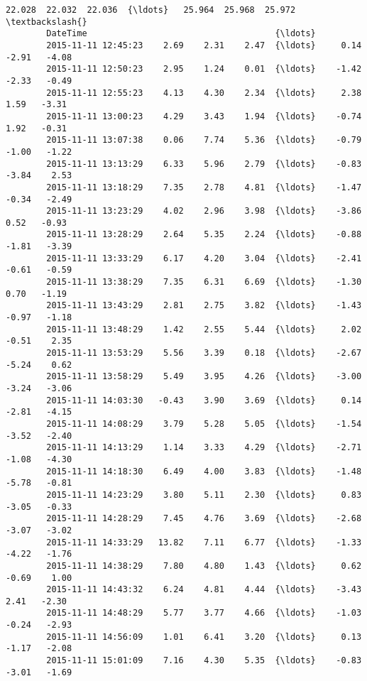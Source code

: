 \documentclass[a4paper,dvipdfmx]{jsarticle}
\begin{document}
\begin{Verbatim}[commandchars=\\\{\}]
                             22.028  22.032  22.036  {\ldots}   25.964  25.968  25.972  \textbackslash{}
        DateTime                                     {\ldots}                            
        2015-11-11 12:45:23    2.69    2.31    2.47  {\ldots}     0.14   -2.91   -4.08   
        2015-11-11 12:50:23    2.95    1.24    0.01  {\ldots}    -1.42   -2.33   -0.49   
        2015-11-11 12:55:23    4.13    4.30    2.34  {\ldots}     2.38    1.59   -3.31   
        2015-11-11 13:00:23    4.29    3.43    1.94  {\ldots}    -0.74    1.92   -0.31   
        2015-11-11 13:07:38    0.06    7.74    5.36  {\ldots}    -0.79   -1.00   -1.22   
        2015-11-11 13:13:29    6.33    5.96    2.79  {\ldots}    -0.83   -3.84    2.53   
        2015-11-11 13:18:29    7.35    2.78    4.81  {\ldots}    -1.47   -0.34   -2.49   
        2015-11-11 13:23:29    4.02    2.96    3.98  {\ldots}    -3.86    0.52   -0.93   
        2015-11-11 13:28:29    2.64    5.35    2.24  {\ldots}    -0.88   -1.81   -3.39   
        2015-11-11 13:33:29    6.17    4.20    3.04  {\ldots}    -2.41   -0.61   -0.59   
        2015-11-11 13:38:29    7.35    6.31    6.69  {\ldots}    -1.30    0.70   -1.19   
        2015-11-11 13:43:29    2.81    2.75    3.82  {\ldots}    -1.43   -0.97   -1.18   
        2015-11-11 13:48:29    1.42    2.55    5.44  {\ldots}     2.02   -0.51    2.35   
        2015-11-11 13:53:29    5.56    3.39    0.18  {\ldots}    -2.67   -5.24    0.62   
        2015-11-11 13:58:29    5.49    3.95    4.26  {\ldots}    -3.00   -3.24   -3.06   
        2015-11-11 14:03:30   -0.43    3.90    3.69  {\ldots}     0.14   -2.81   -4.15   
        2015-11-11 14:08:29    3.79    5.28    5.05  {\ldots}    -1.54   -3.52   -2.40   
        2015-11-11 14:13:29    1.14    3.33    4.29  {\ldots}    -2.71   -1.08   -4.30   
        2015-11-11 14:18:30    6.49    4.00    3.83  {\ldots}    -1.48   -5.78   -0.81   
        2015-11-11 14:23:29    3.80    5.11    2.30  {\ldots}     0.83   -3.05   -0.33   
        2015-11-11 14:28:29    7.45    4.76    3.69  {\ldots}    -2.68   -3.07   -3.02   
        2015-11-11 14:33:29   13.82    7.11    6.77  {\ldots}    -1.33   -4.22   -1.76   
        2015-11-11 14:38:29    7.80    4.80    1.43  {\ldots}     0.62   -0.69    1.00   
        2015-11-11 14:43:32    6.24    4.81    4.44  {\ldots}    -3.43    2.41   -2.30   
        2015-11-11 14:48:29    5.77    3.77    4.66  {\ldots}    -1.03   -0.24   -2.93   
        2015-11-11 14:56:09    1.01    6.41    3.20  {\ldots}     0.13   -1.17   -2.08   
        2015-11-11 15:01:09    7.16    4.30    5.35  {\ldots}    -0.83   -3.01   -1.69   

\end{Verbatim}
\end{document}
